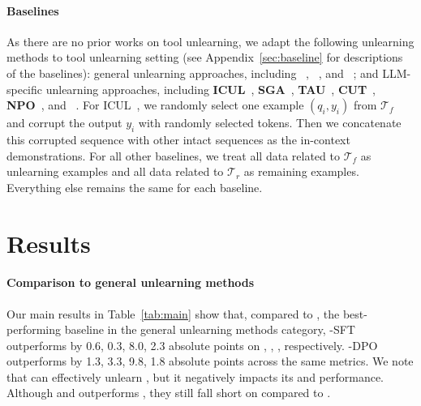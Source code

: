 \paragraph{Baselines}
As there are no prior works on tool unlearning, we adapt the following unlearning methods to tool unlearning setting (see Appendix~\ref{sec:baseline} for descriptions of the baselines):
general unlearning approaches, including 
\textbf{\GA}~\citep{Golatkar2020EternalSO,yao-etal-2024-machine}, 
\textbf{\RL}~\citep{amnesiac_2021}, and 
\textbf{\SU}~\citep{fan2024salun}; 
and LLM-specific unlearning approaches, including  
\textbf{ICUL}~\citep{icul}, 
\textbf{SGA}~\citep{jang-etal-2023-knowledge,barbulescu2024textual}, 
\textbf{TAU}~\citep{barbulescu2024textual}, 
\textbf{CUT}~\citep{li2024wmdp},  
\textbf{NPO}~\citep{zhang2024negative}, and
\textbf{\SO}~\citep{jia-etal-2024-soul}.
For ICUL~\citep{icul}, we randomly select one example $(q_i, y_i)$ from $\mathcal{T}_f$ and corrupt the output $y_i$ with randomly selected tokens. Then we concatenate this corrupted sequence with other intact sequences as the in-context demonstrations. For all other baselines, we treat all data related to $\mathcal{T}_f$ as unlearning examples and all data related to $\mathcal{T}_r$ as remaining examples. Everything else remains the same for each baseline. 



\section{Results}



\paragraph{Comparison to general unlearning methods}
Our main results in Table~\ref{tab:main} show that, compared to \RET, the best-performing baseline in the general unlearning methods category, \method-SFT outperforms \RET by 0.6, 0.3, 8.0, 2.3 absolute points on \ttest, \tr, \tf, \tg respectively. \method-DPO outperforms \RET by 1.3, 3.3, 9.8, 1.8 absolute points across the same metrics. We note that \GA can effectively unlearn \tf, but it negatively impacts its \ttest and \tr performance. Although \RL and \SU outperforms \GA, they still fall short on \tg compared to \method.


